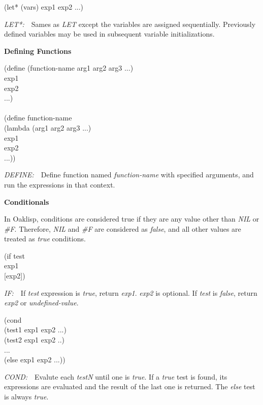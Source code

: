 \documentclass[12pt]{article}
\begin{document}
\parbox[t]{3.4in}{
(let* (vars)  exp1 exp2 ...)
}\parbox[t]{3.5in}{
 \emph{LET*:}\ \ Sames as \emph{LET} except the variables are assigned sequentially.  Previously defined variables may be used in subsequent variable initializations.
}


\newpage

{\Large \bfseries Defining Functions}

\bigskip


\parbox[t]{3.4in}{
(define (function-name arg1 arg2 arg3 ...)\\
\hspace*{4em}    exp1\\
\hspace*{4em}    exp2\\
\hspace*{4em}    ...)\\
\\
(define function-name\\
\hspace*{4em}(lambda (arg1 arg2 arg3 ...)\\
\hspace*{4em}    exp1\\
\hspace*{4em}    exp2\\
\hspace*{4em}    ...))
}\parbox[t]{3.5in}{
 \emph{DEFINE:}\ \ Define function named \emph{function-name} with specified arguments, and run the expressions in that context.
}

\bigskip

{\Large \bfseries Conditionals}

\smallskip

In Oaklisp, conditions are considered true if they are any value other
than \emph{NIL} or \emph{\#F}.  Therefore, \emph{NIL} and \emph{\#F} are considered as \emph{false},
and all other values are treated as \emph{true} conditions.


\parbox[t]{3.4in}{
(if test\\
\hspace*{2em}    exp1\\
\hspace*{2em}    [exp2])
}\parbox[t]{3.5in}{
 \emph{IF:}\ \ If \emph{test} expression is \emph{true}, return \emph{exp1}.
 \emph{exp2} is optional.  If \emph{test} is \emph{false}, return \emph{exp2} or \emph{undefined-value}.
}

\parbox[t]{3.4in}{
(cond\\
\hspace*{2em}    (test1 exp1 exp2 ...)\\
\hspace*{2em}    (test2 exp1 exp2 ..)\\
\hspace*{2em}    ...\\
\hspace*{2em}    (else exp1 exp2 ...))
}\parbox[t]{3.5in}{
 \emph{COND:}\ \ Evalute each \emph{testN} until one is \emph{true}.
 If a \emph{true} test is found, its expressions are evaluated and the
 result of the last one is returned.  The \emph{else} test is always \emph{true}.
}
\end{document}
